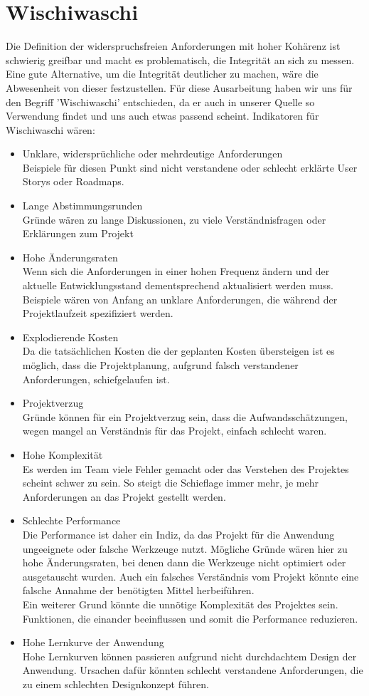 \documentclass[a4paper, ngerman, 12pt, usenames, dvipsnames]{article}
\begin{document}
\section{Wischiwaschi}
Die Definition der widerspruchsfreien Anforderungen mit hoher Kohärenz ist schwierig greifbar und macht es problematisch, die Integrität an sich zu messen.
Eine gute Alternative, um die Integrität deutlicher zu machen, wäre die Abwesenheit von dieser festzustellen. Für diese Ausarbeitung haben wir uns für den Begriff 'Wischiwaschi' entschieden, da er auch in unserer Quelle so Verwendung findet und uns auch etwas passend scheint. Indikatoren für Wischiwaschi wären: \\
\begin{itemize}
\item Unklare, widersprüchliche oder mehrdeutige Anforderungen\\
Beispiele für diesen Punkt sind nicht verstandene oder schlecht erklärte User Storys oder Roadmaps.
\item Lange Abstimmungsrunden\\
Gründe wären zu lange Diskussionen, zu viele Verständnisfragen oder Erklärungen zum Projekt
\item Hohe Änderungsraten\\
Wenn sich die Anforderungen in einer hohen Frequenz ändern und der aktuelle Entwicklungsstand dementsprechend aktualisiert werden muss. Beispiele wären von Anfang an unklare Anforderungen, die während der Projektlaufzeit spezifiziert werden.
\item Explodierende Kosten\\
Da die tatsächlichen Kosten die der geplanten Kosten übersteigen ist es möglich, dass die Projektplanung, aufgrund falsch verstandener Anforderungen, schiefgelaufen ist.
\item Projektverzug\\
Gründe können für ein Projektverzug sein, dass die Aufwandsschätzungen, wegen mangel an Verständnis für das Projekt, einfach schlecht waren.
\item Hohe Komplexität\\
Es werden im Team viele Fehler gemacht oder das Verstehen des Projektes scheint schwer zu sein. So steigt die Schieflage immer mehr, je mehr Anforderungen an das Projekt gestellt werden.
\item Schlechte Performance\\
Die Performance ist daher ein Indiz, da das Projekt für die Anwendung ungeeignete oder falsche Werkzeuge nutzt. Mögliche Gründe wären hier zu hohe Änderungsraten, bei denen dann die Werkzeuge nicht optimiert oder ausgetauscht wurden. Auch ein falsches Verständnis vom Projekt könnte eine falsche Annahme der benötigten Mittel herbeiführen.\\
Ein weiterer Grund könnte die unnötige Komplexität des Projektes sein. Funktionen, die einander beeinflussen und somit die Performance reduzieren.
\item Hohe Lernkurve der Anwendung\\
Hohe Lernkurven können passieren aufgrund nicht durchdachtem Design der Anwendung. Ursachen dafür könnten schlecht verstandene Anforderungen, die zu einem schlechten Designkonzept führen.
\end{itemize}
\end{document}
